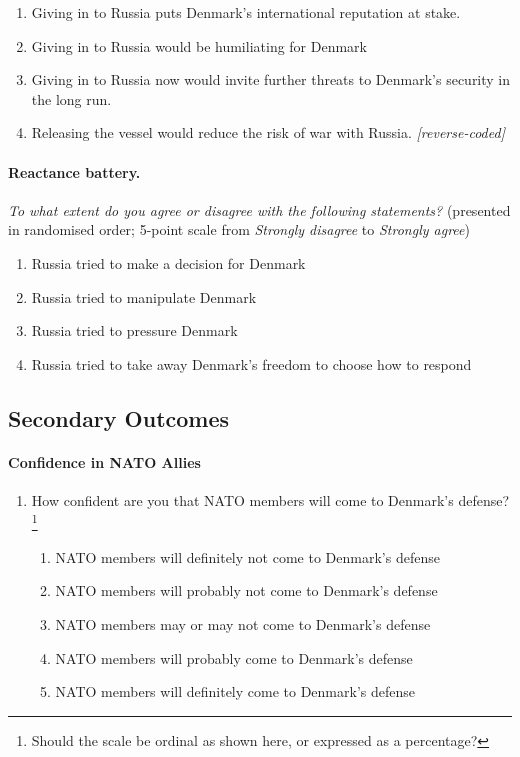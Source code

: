 \begin{enumerate}
    \item Giving in to Russia puts Denmark's international reputation at stake.
    \item Giving in to Russia would be humiliating for Denmark
    \item Giving in to Russia now would invite further threats to Denmark's security in the long run.
    \item Releasing the vessel would reduce the risk of war with Russia. \hfill \textit{[reverse-coded]}
\end{enumerate}

\paragraph{Reactance battery.}
\textit{To what extent do you agree or disagree with the following statements?} (presented in randomised order; 5-point scale from \textit{Strongly disagree} to \textit{Strongly agree})

\begin{enumerate}
    \item Russia tried to make a decision for Denmark
    \item Russia tried to manipulate Denmark
    \item Russia tried to pressure Denmark 
    \item Russia tried to take away Denmark's freedom to choose how to respond
\end{enumerate}

\subsection{Secondary Outcomes}
\paragraph{Confidence in NATO Allies}
\begin{enumerate}
\item How confident are you that NATO members will come to Denmark's defense?\footnote{Should the scale be ordinal as shown here, or expressed as a percentage?}
\begin{enumerate}
    \item NATO members will definitely not come to Denmark's defense
    \item NATO members will probably not come to Denmark's defense
    \item NATO members may or may not come to Denmark's defense
    \item NATO members will probably come to Denmark's defense
    \item NATO members will definitely come to Denmark's defense
\end{enumerate}
\end{enumerate}
